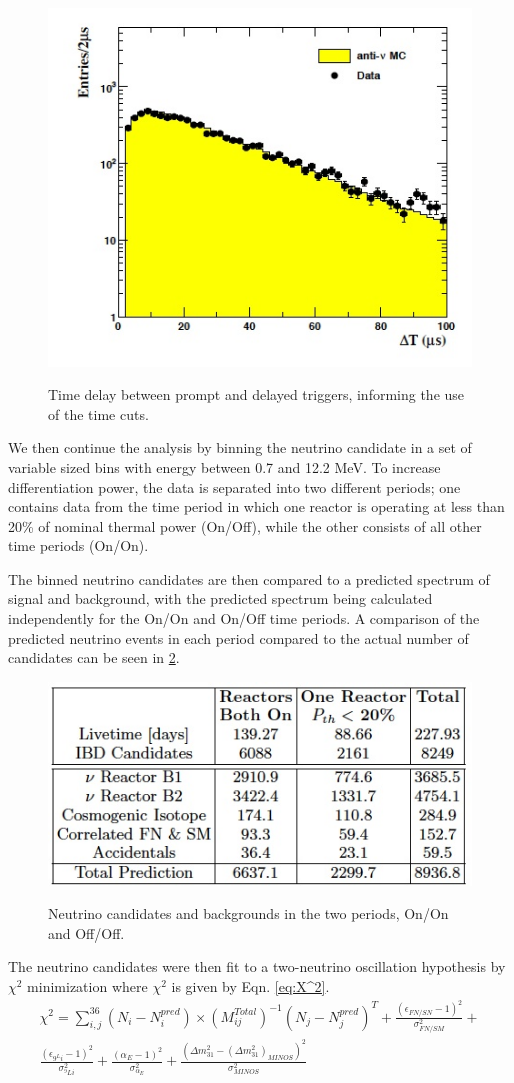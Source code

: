  \begin{figure}
 \caption{Time delay between prompt and delayed triggers, informing the use of the time cuts.}
 \includegraphics[width = .5 \textwidth]{DC_Results/Time_Dist.jpg}
 \label{PD_Time_Dist}
 \end{figure}
 
We then continue the analysis by binning the neutrino candidate in a set of variable sized bins with energy between 0.7 and 12.2 MeV. To increase differentiation power, the data is separated into two different periods; one contains data from the time period in which one reactor is operating at less than 20\% of nominal thermal power (On/Off), while the other consists of all other time periods (On/On). 

The binned neutrino candidates are then compared to a predicted spectrum of signal and background, with the predicted spectrum being calculated independently for the On/On and On/Off time periods. A comparison of the predicted neutrino events in each period compared to the actual number of candidates can be seen in \ref{IBD_Summary}. 

\begin{figure}
\caption{Neutrino candidates and backgrounds in the two periods, On/On and Off/Off.}
\includegraphics[width=.5 \textwidth]{DC_Results/IBD_Summary.jpg}
\label{IBD_Summary}
\end{figure}


The neutrino candidates were then fit to a two-neutrino oscillation hypothesis by $\chi ^2$ minimization where $\chi^2$ is given by Eqn. \ref{eq:X^2}. 
\begin{multline}
 \chi^2 = \sum^{36}_{i,j} (N_i - N_{i}^{pred} ) \times (M_{ij}^{Total})^{-1}(N_j - N_j^{pred})^{T} + \frac{(\epsilon_{FN/SN} -1)^2}{ \sigma^2_{FN/SM}} + \\
 \frac{(\epsilon_{9^Li} -1)^2}{\sigma^2_{^9Li}} + \frac{(\alpha_{E} -1)^2}{\sigma^2_{\alpha_{E}}} + \frac{(\Delta m^2_{31} - (\Delta m^2_{31})_{MINOS})^2}{\sigma^2_{MINOS}} 
 \label{eq::X^2}
 \end{multline}
 
